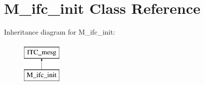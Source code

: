 \hypertarget{class_m__ifc__init}{}\section{M\+\_\+ifc\+\_\+init Class Reference}
\label{class_m__ifc__init}
Inheritance diagram for M\+\_\+ifc\+\_\+init\+:\begin{figure}[H]
\begin{center}
\leavevmode
\includegraphics[height=2.000000cm]{class_m__ifc__init}
\end{center}
\end{figure}
